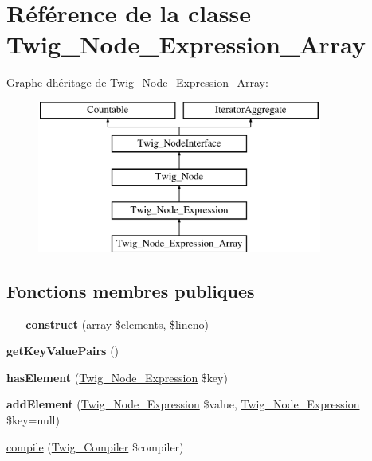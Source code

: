 \hypertarget{class_twig___node___expression___array}{}\section{Référence de la classe Twig\+\_\+\+Node\+\_\+\+Expression\+\_\+\+Array}
\label{class_twig___node___expression___array}
Graphe d\textquotesingle{}héritage de Twig\+\_\+\+Node\+\_\+\+Expression\+\_\+\+Array\+:\begin{figure}[H]
\begin{center}
\leavevmode
\includegraphics[height=5.000000cm]{class_twig___node___expression___array}
\end{center}
\end{figure}
\subsection*{Fonctions membres publiques}
\begin{DoxyCompactItemize}
\item 
{\bfseries \+\_\+\+\_\+construct} (array \$elements, \$lineno)\hypertarget{class_twig___node___expression___array_a393017e9ef64d4b98cc884936c4b225d}{}\label{class_twig___node___expression___array_a393017e9ef64d4b98cc884936c4b225d}

\item 
{\bfseries get\+Key\+Value\+Pairs} ()\hypertarget{class_twig___node___expression___array_a51b6b9e8b46cde4ba3bee149c9bb46a6}{}\label{class_twig___node___expression___array_a51b6b9e8b46cde4ba3bee149c9bb46a6}

\item 
{\bfseries has\+Element} (\hyperlink{class_twig___node___expression}{Twig\+\_\+\+Node\+\_\+\+Expression} \$key)\hypertarget{class_twig___node___expression___array_a9aa43f596dac14beee08b17c0827aecb}{}\label{class_twig___node___expression___array_a9aa43f596dac14beee08b17c0827aecb}

\item 
{\bfseries add\+Element} (\hyperlink{class_twig___node___expression}{Twig\+\_\+\+Node\+\_\+\+Expression} \$value, \hyperlink{class_twig___node___expression}{Twig\+\_\+\+Node\+\_\+\+Expression} \$key=null)\hypertarget{class_twig___node___expression___array_a28a4df69551951ee00cdfb59c0a72c57}{}\label{class_twig___node___expression___array_a28a4df69551951ee00cdfb59c0a72c57}

\item 
\hyperlink{class_twig___node___expression___array_a4e0faa87c3fae583620b84d3607085da}{compile} (\hyperlink{class_twig___compiler}{Twig\+\_\+\+Compiler} \$compiler)
\end{DoxyCompactItemize}
